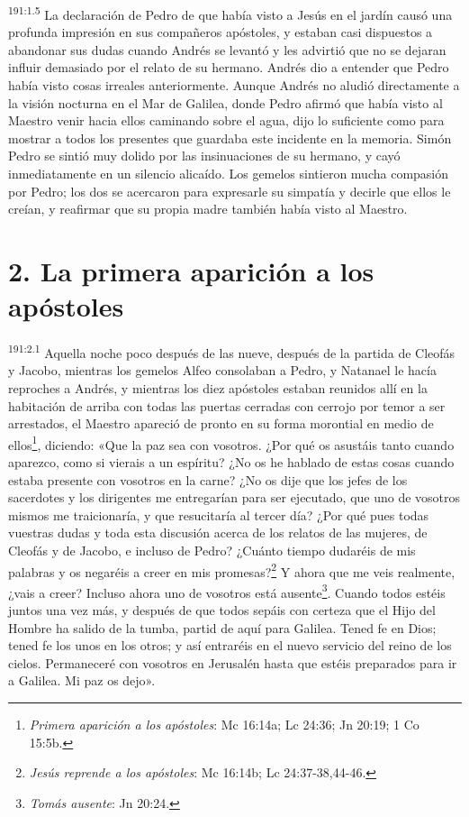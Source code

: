\par
\textsuperscript{191:1.5} La declaración de Pedro de que había visto a Jesús en el jardín causó una profunda impresión en sus compañeros apóstoles, y estaban casi dispuestos a abandonar sus dudas cuando Andrés se levantó y les advirtió que no se dejaran influir demasiado por el relato de su hermano. Andrés dio a entender que Pedro había visto cosas irreales anteriormente. Aunque Andrés no aludió directamente a la visión nocturna en el Mar de Galilea, donde Pedro afirmó que había visto al Maestro venir hacia ellos caminando sobre el agua, dijo lo suficiente como para mostrar a todos los presentes que guardaba este incidente en la memoria. Simón Pedro se sintió muy dolido por las insinuaciones de su hermano, y cayó inmediatamente en un silencio alicaído. Los gemelos sintieron mucha compasión por Pedro; los dos se acercaron para expresarle su simpatía y decirle que ellos le creían, y reafirmar que su propia madre también había visto al Maestro.

\section*{2. La primera aparición a los apóstoles}
\par
\textsuperscript{191:2.1} Aquella noche poco después de las nueve, después de la partida de Cleofás y Jacobo, mientras los gemelos Alfeo consolaban a Pedro, y Natanael le hacía reproches a Andrés, y mientras los diez apóstoles estaban reunidos allí en la habitación de arriba con todas las puertas cerradas con cerrojo por temor a ser arrestados, el Maestro apareció de pronto en su forma morontial en medio de ellos\footnote{\textit{Primera aparición a los apóstoles}: Mc 16:14a; Lc 24:36; Jn 20:19; 1 Co 15:5b.}, diciendo: «Que la paz sea con vosotros. ¿Por qué os asustáis tanto cuando aparezco, como si vierais a un espíritu? ¿No os he hablado de estas cosas cuando estaba presente con vosotros en la carne? ¿No os dije que los jefes de los sacerdotes y los dirigentes me entregarían para ser ejecutado, que uno de vosotros mismos me traicionaría, y que resucitaría al tercer día? ¿Por qué pues todas vuestras dudas y toda esta discusión acerca de los relatos de las mujeres, de Cleofás y de Jacobo, e incluso de Pedro? ¿Cuánto tiempo dudaréis de mis palabras y os negaréis a creer en mis promesas?\footnote{\textit{Jesús reprende a los apóstoles}: Mc 16:14b; Lc 24:37-38,44-46.} Y ahora que me veis realmente, ¿vais a creer? Incluso ahora uno de vosotros está ausente\footnote{\textit{Tomás ausente}: Jn 20:24.}. Cuando todos estéis juntos una vez más, y después de que todos sepáis con certeza que el Hijo del Hombre ha salido de la tumba, partid de aquí para Galilea. Tened fe en Dios; tened fe los unos en los otros; y así entraréis en el nuevo servicio del reino de los cielos. Permaneceré con vosotros en Jerusalén hasta que estéis preparados para ir a Galilea. Mi paz os dejo».

